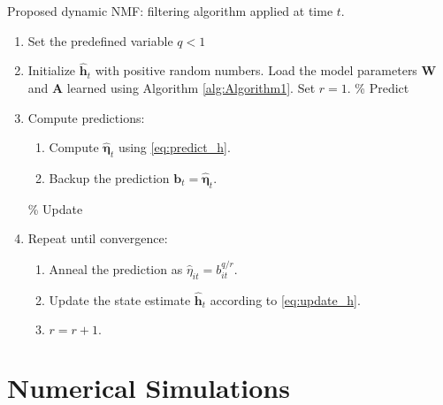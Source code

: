 \documentclass[10pt,twocolumn,twoside] {IEEEtran}
\begin{document}
\begin{algorithm}[t]
\caption{\label{alg:Algorithm2} Proposed dynamic NMF: filtering algorithm applied at time $t$.}
{\small
\begin{enumerate}
  \item Set the predefined variable $q<1$
  \item Initialize $\hat{\mathbf{h}}_t$ with positive random numbers. Load the model parameters $\mathbf{W}$ and $\mathbf{A}$ learned using Algorithm \ref{alg:Algorithm1}. Set $r=1$.
  \newline
  {\color{Gray} \% Predict}
  \item Compute predictions:
\begin{enumerate}
    \item Compute $\hat{\boldsymbol{\eta}}_{t}$ using \eqref{eq:predict_h}.
    \item Backup the prediction $\mathbf{b}_t=\hat{\boldsymbol{\eta}}_{t}$.
  \end{enumerate}
  {\color{Gray} \% Update}
  \item Repeat until convergence:
  \begin{enumerate}
      \item Anneal the prediction as $\hat{\eta}_{it}=b_{it}^{q/r}$.
      \item Update the state estimate $\hat{\mathbf{h}}_{t}$ according to \eqref{eq:update_h}.
      \item $r=r+1.$
  \end{enumerate}
\end{enumerate}
}
\end{algorithm}

\section{Numerical Simulations\label{sec:Numerical-Simulations}}
\end{document}
